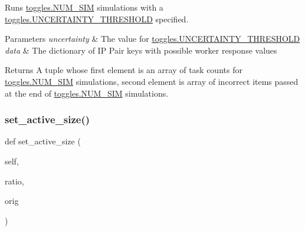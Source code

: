 Runs \hyperlink{namespacedynamicfilterapp_1_1toggles_a3baf5565851cd87736238d8dddfc1106}{toggles.\+N\+U\+M\+\_\+\+S\+IM} simulations with a \hyperlink{namespacedynamicfilterapp_1_1toggles_aaefdc27b85545eb4a910f5c65f7d8bbb}{toggles.\+U\+N\+C\+E\+R\+T\+A\+I\+N\+T\+Y\+\_\+\+T\+H\+R\+E\+S\+H\+O\+LD} specified. 


\begin{DoxyParams}{Parameters}
{\em uncertainty} & The value for \hyperlink{namespacedynamicfilterapp_1_1toggles_aaefdc27b85545eb4a910f5c65f7d8bbb}{toggles.\+U\+N\+C\+E\+R\+T\+A\+I\+N\+T\+Y\+\_\+\+T\+H\+R\+E\+S\+H\+O\+LD} \\
\hline
{\em data} & The dictionary of IP Pair keys with possible worker response values \\
\hline
\end{DoxyParams}
\begin{DoxyReturn}{Returns}
A tuple whose first element is an array of task counts for \hyperlink{namespacedynamicfilterapp_1_1toggles_a3baf5565851cd87736238d8dddfc1106}{toggles.\+N\+U\+M\+\_\+\+S\+IM} simulations, second element is array of incorrect items passed at the end of \hyperlink{namespacedynamicfilterapp_1_1toggles_a3baf5565851cd87736238d8dddfc1106}{toggles.\+N\+U\+M\+\_\+\+S\+IM} simulations. 
\end{DoxyReturn}
\mbox{\label{classdynamicfilterapp_1_1test__simulations_1_1_simulation_test_a966a3c31662ba0c8c2d3d095899ec1ad}} 
\subsubsection{\texorpdfstring{set\+\_\+active\+\_\+size()}{set\_active\_size()}}
{\footnotesize\ttfamily def set\+\_\+active\+\_\+size (\begin{DoxyParamCaption}\item[{}]{self,  }\item[{}]{ratio,  }\item[{}]{orig }\end{DoxyParamCaption})}



